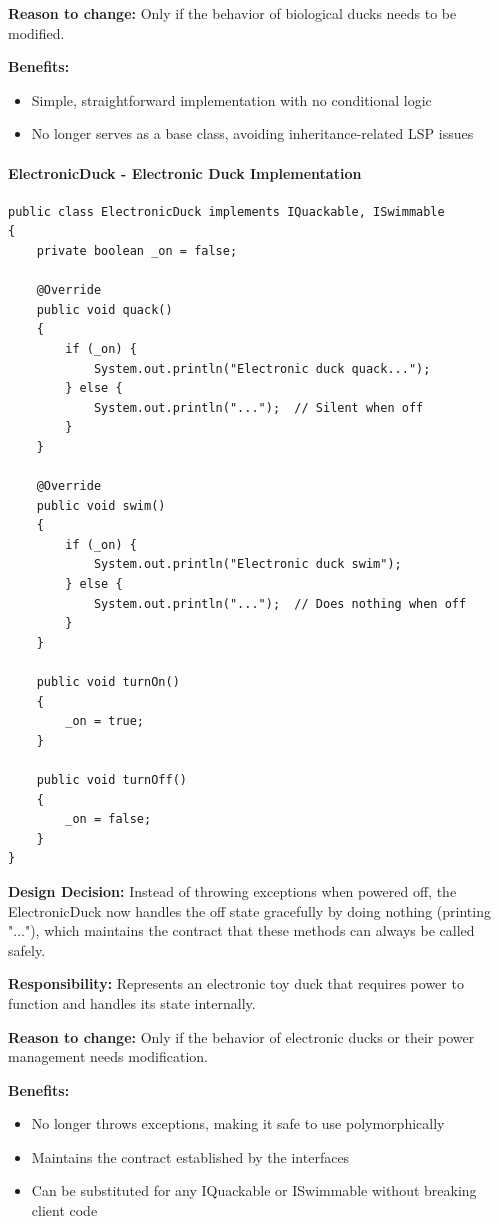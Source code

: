 \textbf{Reason to change:} Only if the behavior of biological ducks needs to be modified.

\textbf{Benefits:}
\begin{itemize}
    \item Simple, straightforward implementation with no conditional logic
    \item No longer serves as a base class, avoiding inheritance-related LSP issues
\end{itemize}

\paragraph{ElectronicDuck - Electronic Duck Implementation}

\begin{verbatim}
public class ElectronicDuck implements IQuackable, ISwimmable
{
    private boolean _on = false;

    @Override
    public void quack()
    {
        if (_on) {
            System.out.println("Electronic duck quack...");
        } else {
            System.out.println("...");  // Silent when off
        }
    }

    @Override
    public void swim()
    {
        if (_on) {
            System.out.println("Electronic duck swim");
        } else {
            System.out.println("...");  // Does nothing when off
        }
    }

    public void turnOn()
    {
        _on = true;
    }

    public void turnOff()
    {
        _on = false;
    }
}
\end{verbatim}

\textbf{Design Decision:} Instead of throwing exceptions when powered off, the ElectronicDuck now handles the off state gracefully by doing nothing (printing "..."), which maintains the contract that these methods can always be called safely.

\textbf{Responsibility:} Represents an electronic toy duck that requires power to function and handles its state internally.

\textbf{Reason to change:} Only if the behavior of electronic ducks or their power management needs modification.

\textbf{Benefits:}
\begin{itemize}
    \item No longer throws exceptions, making it safe to use polymorphically
    \item Maintains the contract established by the interfaces
    \item Can be substituted for any IQuackable or ISwimmable without breaking client code
\end{itemize}

